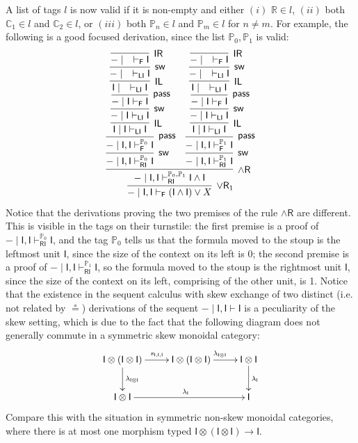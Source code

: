 \documentclass[submission,copyright,creativecommons]{eptcs}
\theoremstyle{definition}
\newcommand{\pass}{\mathsf{pass}}
\newcommand{\unitl}{\mathsf{IL}}
\newcommand{\unitr}{\mathsf{IR}}
\newcommand{\andr}{\land \mathsf{R}}
\newcommand{\orrone}{\lor \mathsf{R}_{1}}
\newcommand{\I}{\mathsf{I}}
\newcommand{\RI}{\mathsf{RI}}
\newcommand{\LI}{\mathsf{LI}}
\newcommand{\F}{\mathsf{F}}
\newcommand{\sw}{\mathsf{sw}}
\newcommand{\tP}{\mathbb{P}}
\newcommand{\tCone}{\mathbb{C}_1}
\newcommand{\tCtwo}{\mathbb{C}_2}
\newcommand{\tE}{\mathbb{R}}
\begin{document}
A list of tags $l$ is now valid if it is non-empty and either $(i)$ $\tE \in l$, $(ii)$ both $\tCone \in l$ and $\tCtwo \in l$, or $(iii)$ both $\tP_n \in l$ and $\tP_m \in l$ for $n \not= m$. For example, the following is a good focused derivation, since the list $\tP_0,\tP_1$ is valid:
\[
\infer[\orrone]{{-} \mid \I,\I \vdash_{\F} (\I \land \I) \lor X}{
  \infer[\andr]{{-} \mid \I,\I \vdash_{\RI}^{\tP_0,\tP_1} \I \land \I}{
    \infer[\sw]{{-} \mid \I,\I \vdash_{\RI}^{\tP_0} \I}{
      \infer[\pass]{{-} \mid \I,\I \vdash_{\F}^{\tP_0} \I}{
        \infer[\unitl]{\I \mid \I \vdash_{\LI} \I}{
          \infer[\sw]{{-} \mid \I \vdash_{\LI} \I}{
            \infer[\pass]{{-} \mid \I \vdash_{\F} \I}{
              \infer[\unitl]{\I \mid \quad \vdash_{\LI} \I}{
                \infer[\sw]{{-} \mid \quad \vdash_{\LI} \I}{
                  \infer[\unitr]{{-} \mid \quad \vdash_{\F} \I}{}
                }
              }
            }
          }
        }
      }
    }
    &
    \infer[\sw]{{-} \mid \I,\I \vdash_{\RI}^{\tP_1} \I}{
      \infer[\pass]{{-} \mid \I,\I \vdash_{\F}^{\tP_1} \I}{
        \infer[\unitl]{\I \mid \I \vdash_{\LI} \I}{
          \infer[\sw]{{-} \mid \I \vdash_{\LI} \I}{
            \infer[\pass]{{-} \mid \I \vdash_{\F} \I}{
              \infer[\unitl]{\I \mid \quad \vdash_{\LI} \I}{
                \infer[\sw]{{-} \mid \quad \vdash_{\LI} \I}{
                  \infer[\unitr]{{-} \mid \quad \vdash_{\F} \I}{}
                }
              }
            }
          }
        }
      }
    }
  }
}
\]
Notice that the derivations proving the two premises of the rule $\andr$ are different. This is visible in the tags on their turnstile: the first premise is a proof of ${-} \mid \I,\I \vdash_{\RI}^{\tP_0} \I$, and the tag $\tP_0$ tells us that the formula moved to the stoup is the leftmost unit $\I$, since the size of the context on its left is 0; the second premise is a proof of ${-} \mid \I,\I \vdash_{\RI}^{\tP_1} \I$, so the formula moved to the stoup is the rightmost unit $\I$, since the size of the context on its left, comprising of the other unit, is 1. Notice that the existence in the sequent calculus with skew exchange of two distinct (i.e. not related by $\circeq$) derivations of the sequent ${-} \mid \I,\I \vdash \I$ is a peculiarity of the skew setting, which is due to the fact that the following diagram does not generally commute in a symmetric skew monoidal category:
\[
\xymatrix{
  \I \otimes (\I \otimes \I) \ar[r]^{s_{\I,\I,\I}} \ar[d]^-{\lambda_{\I \otimes \I}}
  &
  \I \otimes (\I \otimes \I) \ar[r]^{\lambda_{\I \otimes \I}}
  &
  \I \otimes \I \ar[d]^{\lambda_{\I}}
  \\
  \I \otimes \I \ar[rr]^{\lambda_{\I}}
  &&
  \I 
}
\]
Compare this with the situation in symmetric non-skew monoidal categories, where there is at most one morphism typed $\I \otimes (\I \otimes \I) \to \I$.
\end{document}
